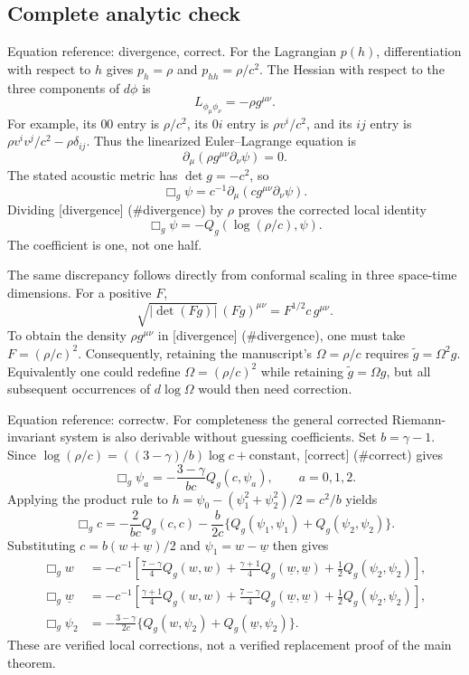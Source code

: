\documentclass[10pt]{article}
\begin{document}
\subsection*{Complete analytic check}
Equation reference: divergence, correct. For the Lagrangian \(p(h)\), differentiation with respect to \(h\) gives \(p_h=\rho\) and \(p_{hh}=\rho/c^2\). The Hessian with respect to the three components of \(d\phi\) is \[L_{\phi_\mu\phi_\nu}=-\rho g^{\mu\nu}.\] For example, its \(00\) entry is \(\rho/c^2\), its \(0i\) entry is \(\rho v^i/c^2\), and its \(ij\) entry is \(\rho v^iv^j/c^2-\rho\delta_{ij}\). Thus the linearized Euler–Lagrange equation is \[
\partial_\mu(\rho g^{\mu\nu}\partial_\nu\psi)=0.\] The stated acoustic metric has \(\det g=-c^2\), so \[\Box_g\psi=c^{-1}\partial_\mu(cg^{\mu\nu}\partial_\nu\psi).\] Dividing [divergence] (\#divergence) by \(\rho\) proves the corrected local identity \[
\boxed{\ \Box_g\psi=-Q_g(\log(\rho/c),\psi).\ }\] The coefficient is one, not one half.\par
The same discrepancy follows directly from conformal scaling in three space-time dimensions. For a positive \(F\), \[\sqrt{|\det(Fg)|}\,(Fg)^{\mu\nu}
=F^{1/2}c\,g^{\mu\nu}.\] To obtain the density \(\rho g^{\mu\nu}\) in [divergence] (\#divergence), one must take \(F=(\rho/c)^2\). Consequently, retaining the manuscript’s \(\Omega=\rho/c\) requires \(\widetilde g=\Omega^2g\). Equivalently one could redefine \(\Omega=(\rho/c)^2\) while retaining \(\widetilde g=\Omega g\), but all subsequent occurrences of \(d\log\Omega\) would then need correction.\par
Equation reference: correctw. For completeness the general corrected Riemann-invariant system is also derivable without guessing coefficients. Set \(b=\gamma-1\). Since \(\log(\rho/c)=((3-\gamma)/b)\log c+\text{constant}\), [correct] (\#correct) gives \[\Box_g\psi_a=-\frac{3-\gamma}{bc}Q_g(c,\psi_a),\qquad a=0,1,2.\] Applying the product rule to \(h=\psi_0-(\psi_1^2+\psi_2^2)/2=c^2/b\) yields \[\Box_gc=-\frac{2}{bc}Q_g(c,c)
-\frac{b}{2c}\{Q_g(\psi_1,\psi_1)+Q_g(\psi_2,\psi_2)\}.\] Substituting \(c=b(w+\underline{w})/2\) and \(\psi_1=w-\underline{w}\) then gives \[\begin{aligned}
\Box_gw&=-c^{-1}\left[
 \frac{7-\gamma}{4}Q_g(w,w)+\frac{\gamma+1}{4}Q_g(\underline{w},\underline{w})
 +\frac12Q_g(\psi_2,\psi_2)\right],\\
\Box_g\underline{w}&=-c^{-1}\left[
 \frac{\gamma+1}{4}Q_g(w,w)+\frac{7-\gamma}{4}Q_g(\underline{w},\underline{w})
 +\frac12Q_g(\psi_2,\psi_2)\right],\\
\Box_g\psi_2&=-\frac{3-\gamma}{2c}
 \{Q_g(w,\psi_2)+Q_g(\underline{w},\psi_2)\}.\end{aligned}\] These are verified local corrections, not a verified replacement proof of the main theorem.\par
\end{document}
